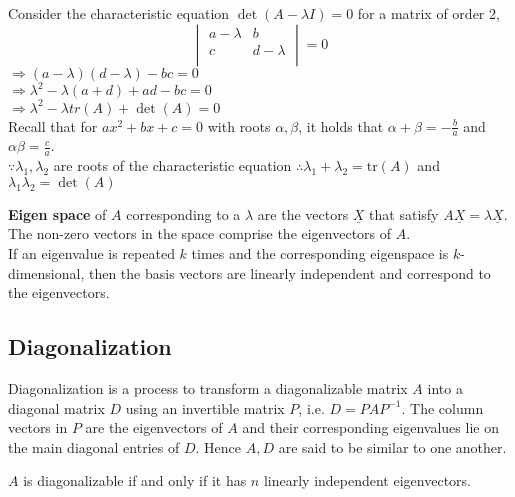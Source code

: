 \documentclass{article}
\begin{document}
\begin{tcolorbox}[colback=lightgray!20, colframe=lightgray!20, fontupper=\linespread{1.5}\selectfont]
	Consider the characteristic equation $\det(A - \lambda I) = 0$ for a matrix of order 2,
	$$\begin{vmatrix} a-\lambda & b \\ c & d-\lambda \\ \end{vmatrix} = 0$$
	$\Rightarrow (a-\lambda)(d-\lambda) - bc = 0$ \\
	$\Rightarrow \lambda^2 - \lambda(a+d) + ad-bc = 0$ \\
	$\Rightarrow \lambda^2 - \lambda tr(A) + \det(A) = 0$ \\
	Recall that for $ax^2+bx+c=0$ with roots $\alpha, \beta$, it holds that $\alpha + \beta = -\frac{b}{a}$ and $\alpha\beta = \frac{c}{a}$. \\
	$\because \lambda_1, \lambda_2$ are roots of the characteristic equation $\therefore \lambda_1 + \lambda_2 = \text{tr}(A)$ and $\lambda_1 \lambda_2 = \det(A)$
\end{tcolorbox}

\textbf{Eigen space} of $A$ corresponding to a $\lambda$ are the vectors $\underline{X}$ that satisfy $A\underline{X} = \lambda\underline{X}$. The non-zero vectors in the space comprise the eigenvectors of $A$. \\
If an eigenvalue is repeated $k$ times and the corresponding eigenspace is $k$-dimensional, then the basis vectors are linearly independent and correspond to the eigenvectors.

\subsection{Diagonalization}

Diagonalization is a process to transform a diagonalizable matrix $A$ into a diagonal matrix $D$ using an invertible matrix $P$, i.e. $D = PAP^{-1}$. The column vectors in $P$ are the eigenvectors of $A$ and their corresponding eigenvalues lie on the main diagonal entries of $D$. Hence $A,D$ are said to be similar to one another.

$A$ is diagonalizable if and only if it has $n$ linearly independent eigenvectors.
\end{document}

